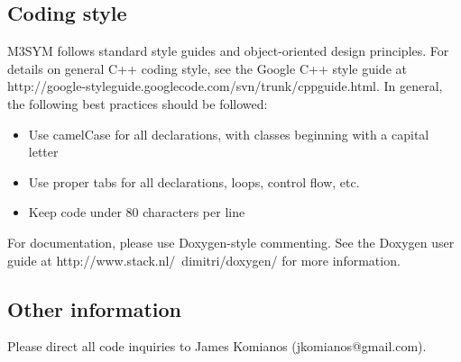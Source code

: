 \documentclass[11pt, oneside]{article}   	%
\begin{document}
\subsection{Coding style}

M3SYM follows standard style guides and object-oriented design principles. For details on general C++ coding style, see the Google C++ style guide at http://google-styleguide.googlecode.com/svn/trunk/cppguide.html. In general, the following best practices should be followed:

\begin{itemize}

\item Use camelCase for all declarations, with classes beginning with a capital letter
\item Use proper tabs for all declarations, loops, control flow, etc.
\item Keep code under 80 characters per line

\end{itemize}

\noindent For documentation, please use Doxygen-style commenting. See the Doxygen user guide at 
http://www.stack.nl/~dimitri/doxygen/ for more information.

\subsection{Other information}

Please direct all code inquiries to James Komianos (jkomianos@gmail.com).
\end{document}
